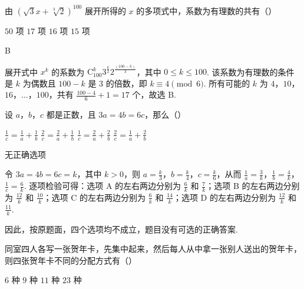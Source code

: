 \documentclass[UTF8,a4paper,oneside,11pt]{ctexbook}
\begin{document}
\begin{problem}
由 \((\sqrt{3}x + \sqrt[3]{2})^{100}\) 展开所得的 \(x\) 的多项式中，系数为有理数的共有（\quad）

\choices
    {\(50\) 项}
    {\(17\) 项}
    {\(16\) 项}
    {\(15\) 项}
\end{problem}

\begin{answer}
B
\end{answer}

\begin{solution}
展开式中 \(x^k\) 的系数为
\(\mathrm C_{100}^{k}3^{\frac{k}{2}}2^{\frac{(100-k)}{3}}\)，其中 \(0\leqslant k\leqslant100\). 该系数为有理数的条件是
\(k\) 为偶数且 \(100-k\) 是 \(3\) 的倍数，即 \(k\equiv4\pmod 6\). 所有可能的 \(k\) 为
\(4\)，\(10\)，\(16\)，\(\dots\)，\(100\)，共有
\(\frac{100-4}{6}+1=17\) 个，故选 B.
\end{solution}

\begin{problem}
设 \(a\)，\(b\)，\(c\) 都是正数，且 \(3a = 4b = 6c\)，那么（\quad）

\choices
    {\(\frac{1}{c} = \frac{1}{a} + \frac{1}{b}\)}
    {\(\frac{2}{c} = \frac{2}{a} +\frac{1}{b}\)}
    {\(\frac{1}{c} = \frac{2}{a} +\frac{2}{b}\)}
    {\(\frac{2}{c} = \frac{1}{a} +\frac{2}{b}\)}
\end{problem}

\begin{answer}
无正确选项
\end{answer}

\begin{solution}
令 \(3a=4b=6c=k\)，其中 \(k>0\)，则
\(a=\frac{k}{3}\)，\(b=\frac{k}{4}\)，\(c=\frac{k}{6}\)，从而
\(\frac{1}{a}=\frac{3}{k}\)，\(\frac{1}{b}=\frac{4}{k}\)，\(\frac{1}{c}=\frac{6}{k}\).
逐项检验可得：选项 A 的左右两边分别为 \(\frac{6}{k}\) 和 \(\frac{7}{k}\)；选项 B 的左右两边分别为 \(\frac{12}{k}\) 和 \(\frac{10}{k}\)；选项 C 的左右两边分别为 \(\frac{6}{k}\) 和 \(\frac{14}{k}\)；选项 D 的左右两边分别为 \(\frac{12}{k}\) 和 \(\frac{11}{k}\).

因此，按原题面，四个选项均不成立，题目没有可选的正确答案.
\end{solution}

\begin{problem}
同室四人各写一张贺年卡，先集中起来，然后每人从中拿一张别人送出的贺年卡，则四张贺年卡不同的分配方式有（\quad）

\choices
    {\(6\) 种}
    {\(9\) 种}
    {\(11\) 种}
    {\(23\) 种}
\end{problem}
\end{document}
